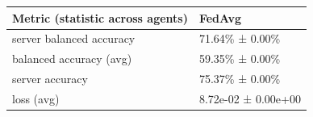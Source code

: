 \begin{tabular}{ll}
\hline
 Metric (statistic across agents)   & FedAvg              \\
\hline
 server balanced accuracy           & 71.64\% ± 0.00\%      \\
 balanced accuracy (avg)            & 59.35\% ± 0.00\%      \\
 server accuracy                    & 75.37\% ± 0.00\%      \\
 loss (avg)                         & 8.72e-02 ± 0.00e+00 \\
\hline
\end{tabular}